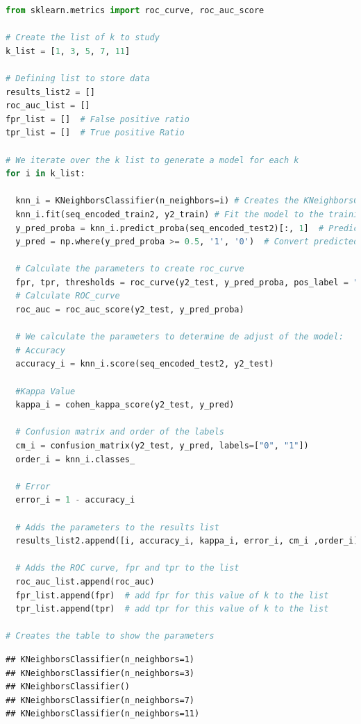 \documentclass[
]{article}
\begin{document}
\begin{lstlisting}[language=Python]
from sklearn.metrics import roc_curve, roc_auc_score

# Create the list of k to study
k_list = [1, 3, 5, 7, 11]

# Defining list to store data
results_list2 = []
roc_auc_list = []
fpr_list = []  # False positive ratio
tpr_list = []  # True positive Ratio

# We iterate over the k list to generate a model for each k
for i in k_list:
  
  knn_i = KNeighborsClassifier(n_neighbors=i) # Creates the KNeighborsClassifier object with k=i
  knn_i.fit(seq_encoded_train2, y2_train) # Fit the model to the training set
  y_pred_proba = knn_i.predict_proba(seq_encoded_test2)[:, 1]  # Predicted probabilities of class 1
  y_pred = np.where(y_pred_proba >= 0.5, '1', '0')  # Convert predicted probabilities to binary class labels
  
  # Calculate the parameters to create roc_curve
  fpr, tpr, thresholds = roc_curve(y2_test, y_pred_proba, pos_label = "1")
  # Calculate ROC_curve
  roc_auc = roc_auc_score(y2_test, y_pred_proba)
  
  # We calculate the parameters to determine de adjust of the model:
  # Accuracy
  accuracy_i = knn_i.score(seq_encoded_test2, y2_test)
  
  #Kappa Value
  kappa_i = cohen_kappa_score(y2_test, y_pred)
  
  # Confusion matrix and order of the labels
  cm_i = confusion_matrix(y2_test, y_pred, labels=["0", "1"])
  order_i = knn_i.classes_
  
  # Error
  error_i = 1 - accuracy_i
  
  # Adds the parameters to the results list
  results_list2.append([i, accuracy_i, kappa_i, error_i, cm_i ,order_i])
  
  # Adds the ROC curve, fpr and tpr to the list
  roc_auc_list.append(roc_auc)
  fpr_list.append(fpr)  # add fpr for this value of k to the list
  tpr_list.append(tpr)  # add tpr for this value of k to the list

# Creates the table to show the parameters
\end{lstlisting}

\begin{lstlisting}
## KNeighborsClassifier(n_neighbors=1)
## KNeighborsClassifier(n_neighbors=3)
## KNeighborsClassifier()
## KNeighborsClassifier(n_neighbors=7)
## KNeighborsClassifier(n_neighbors=11)
\end{lstlisting}
\end{document}
